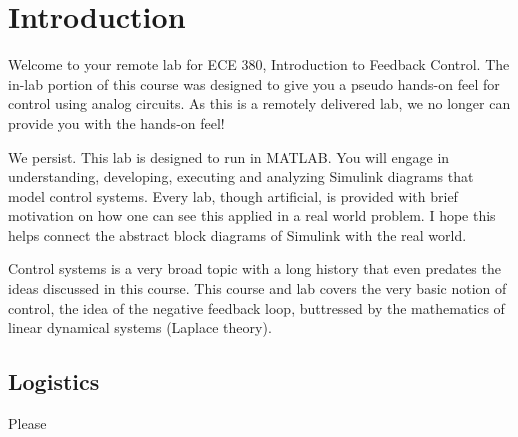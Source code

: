 \chapter{Introduction}
Welcome to your remote lab for ECE 380, Introduction to Feedback Control.
The in-lab portion of this course was designed to give you a pseudo hands-on
feel for control using analog circuits. As this is a remotely delivered lab,
we no longer can provide you with the hands-on feel!

We persist. This lab is designed to run in MATLAB. You will engage
in understanding, developing, executing and analyzing Simulink
diagrams that model control systems. Every lab, though artificial, is
provided with brief motivation on how one can see this applied in a real
world problem. I hope this helps connect the abstract block diagrams of
Simulink with the real world.

Control systems is a very broad topic with a long history that even predates
the ideas discussed in this course. This course and lab covers the very basic
notion of control, the idea of the negative feedback loop, buttressed by
the mathematics of linear dynamical systems (Laplace theory).

\section{Logistics}
Please

